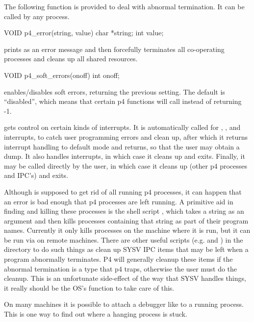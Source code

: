 The following function is provided to deal with abnormal termination.
It can be called by any process.

\begin{example}
VOID p4_error(string, value)
char *string;
int value;
\end{example}
\noindent
prints  as an error message and then forcefully terminates
all co-operating processes and cleans up all shared resources.

\begin{example}
VOID p4_soft_errors(onoff)     
int onoff;
\end{example}
\noindent
enables/disables soft errors, returning the previous setting.  The default
is ``disabled'', which means that certain p4 functions will call
 instead of returning -1.

 gets control on certain kinds of interrupts.  It is
automatically called for , , and 
interrupts, to catch user programming errors and clean up, after which it
returns interrupt handling to default mode and returns, so that the user
may obtain a dump.  It also handles  interrupts, in which case
it cleans up and exits.  Finally, it may be called directly by the user, in
which case it cleans up (other p4 processes and IPC's) and exits.

Although  is supposed to get rid of all running p4
processes, it can happen that an error is bad enough that p4 processes
are left running.  A primitive aid in finding and killing these
processes is the shell script , which takes a string as an
argument and then kills processes containing that string as part of
their program names.  Currently it only kills processes on the machine
where it is run, but it can be run via  on remote machines.
There are other useful scripts (e.g.  and )
in the  directory to do such things as clean up SYSV IPC 
items that may be left when a program abnormally terminates.  P4 will 
generally cleanup these items if the abnormal termination is a type that 
p4 traps, otherwise the user must do the cleanup.  This is an unfortunate
side-effect of the way that SYSV handles things, it really should be
the OS's function to take care of this.

On many machines it is possible to attach a debugger like  to a
running process.  This is one way to find out where a hanging process is
stuck. 



